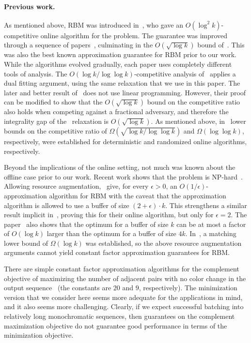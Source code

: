 \documentclass[11pt]{article}
\newcommand{\eps}{\epsilon}
\begin{document}
\paragraph{Previous work.}
As mentioned above, RBM was introduced in~\cite{RSW02}, who gave an
$O(\log^2 k)$-competitive online algorithm for the problem. The guarantee
was improved through a sequence of papers~\cite{EW05,AR10,ACER11},
culminating in the $O(\sqrt{\log k})$ bound of~\cite{ACER11}. This was
also the best known approximation guarantee for RBM prior to our work.
While the algorithms evolved gradually, each paper uses completely different
tools of analysis. The $O(\log k / \log\log k)$-competitive analysis of~\cite{AR10}
applies a dual fitting argument, using the same relaxation that we use in this paper.
The later and better result of~\cite{ACER11} does not use linear programming.
However, their proof can be modified to show that the $O(\sqrt{\log k})$ bound
on the competitive ratio also holds when competing against a fractional
adversary, and therefore the integrality gap of the~\cite{AR10} relaxation
is $O(\sqrt{\log k})$. As mentioned above, in~\cite{ACER11} lower bounds
on the competitive ratio of $\Omega(\sqrt{\log k/\log\log k})$ and
$\Omega(\log\log k)$, respectively, were established for deterministic and
randomized online algorithms, respectively.

Beyond the implications of the online setting, not much was known about the
offline case prior to our work. Recent work shows that the problem is
NP-hard~\cite{CMSS10,AKM10}. Allowing resource augmentation,~\cite{CMSS10}
give, for every $\eps > 0$, an $O(1/\eps)$-approximation algorithm for RBM
with the caveat that the approximation algorithm is allowed to use a buffer of
size $(2+\eps)\cdot k$. This strengthens a similar result implicit in~\cite{EW05},
proving this for their online algorithm, but only for $\eps = 2$. The
paper~\cite{EW05} also
shows that the optimum for a buffer of size $k$ can be at most a factor of
$O(\log k)$ larger than the optimum for a buffer of size $4k$. In~\cite{Abo08},
a matching  lower bound of $\Omega(\log k)$ was established, so the above
resource augmentation arguments cannot yield constant factor approximation
guarantees for RBM.

There are simple constant factor approximation algorithms for the complement
objective of maximizing the number of adjacent pairs with no color change in
the output sequence~\cite{KP04,BL07} (the constants are $20$ and $9$, respectively).
The minimization version that we consider
here seems more adequate for the applications in mind, and it also seems more
challenging. Clearly, if we expect successful batching into relatively long
monochromatic sequences, then guarantees on the complement maximization
objective do not guarantee good performance in terms of the minimization
objective.
\end{document}
